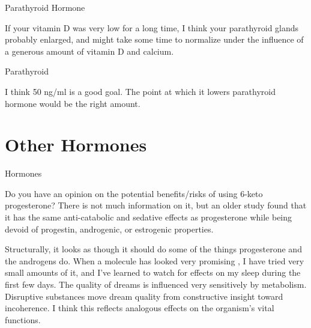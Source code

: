 \documentclass[11pt,oneside,openany,extrafontsizes]{memoir}
\begin{document}
\begin{standalonequote}{Parathyroid Hormone}

    \begin{answer}
        If your vitamin D was very low for a long time, I think your parathyroid glands probably enlarged, and might take some time to normalize under the influence of a generous amount of vitamin D and calcium.
    \end{answer}
\end{standalonequote}

\begin{standalonequote}{Parathyroid}

    \begin{answer}
        I think 50 ng/ml is a good goal. The point at which it lowers parathyroid hormone would be the right amount.
    \end{answer}
\end{standalonequote}

\section{Other Hormones}

\begin{qaexchange}{Hormones}

    \begin{question}
        Do you have an opinion on the potential benefits/risks of using 6-keto progesterone? There is not much information on it, but an older study found that it has the same anti-catabolic and sedative effects as progesterone while being devoid of progestin, androgenic, or estrogenic properties.
    \end{question}

    \begin{answer}
        Structurally, it looks as though it should do some of the things progesterone and the androgens do. When a molecule has looked very promising , I have tried very small amounts of it, and I've learned to watch for effects on my sleep during the first few days. The quality of dreams is influenced very sensitively by metabolism. Disruptive substances move dream quality from constructive insight toward incoherence. I think this reflects analogous effects on the organism's vital functions.
    \end{answer}
\end{qaexchange}
\end{document}
